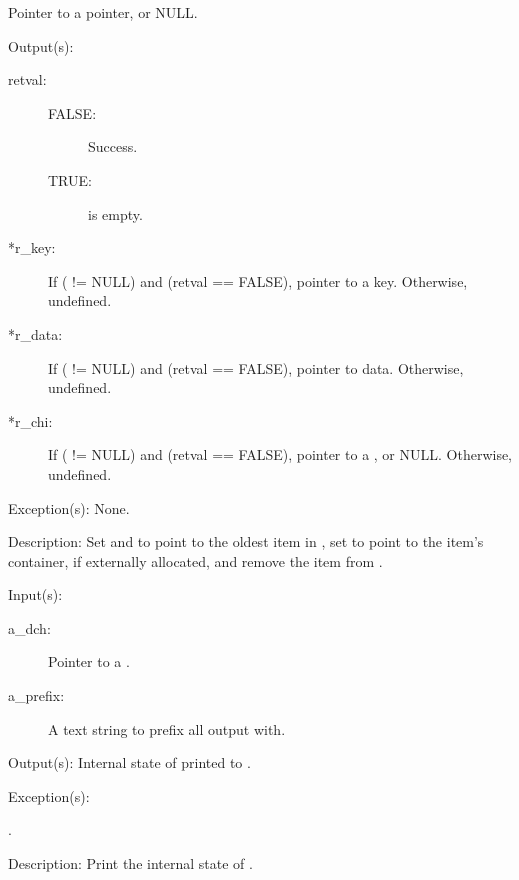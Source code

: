 \begin{capi}
\begin{capilist}
\begin{description}
			Pointer to a  pointer, or NULL.
		\end{description}
	\item[Output(s): ]
		\begin{description}\item[]
		\item[retval: ]
			\begin{description}\item[]
			\item[FALSE: ]
				Success.
			\item[TRUE: ]
				 is empty.
			\end{description}
		\item[*r\_key: ]
			If ( != NULL) and (retval == FALSE),
			pointer to a key.  Otherwise, undefined.
		\item[*r\_data: ]
			If ( != NULL) and (retval == FALSE),
			pointer to data.  Otherwise, undefined.
		\item[*r\_chi: ]
			If ( != NULL) and (retval == FALSE),
			pointer to a , or NULL.  Otherwise,
			undefined.
		\end{description}
	\item[Exception(s): ] None.
	\item[Description: ]
		Set  and  to point to the oldest
		item in , set  to point to the item's
		container, if externally allocated, and remove the item from
		.
	\end{capilist}
\label{dch_dump}
	\begin{capilist}
	\item[Input(s): ]
		\begin{description}\item[]
		\item[a\_dch: ]
			Pointer to a .
		\item[a\_prefix: ]
			A text string to prefix all output with.
		\end{description}
	\item[Output(s): ]
		Internal state of  printed to .
	\item[Exception(s): ]
		\begin{description}\item[]
		\item[.]
		\end{description}
	\item[Description: ]
		Print the internal state of .
	\end{capilist}
\end{capi}
